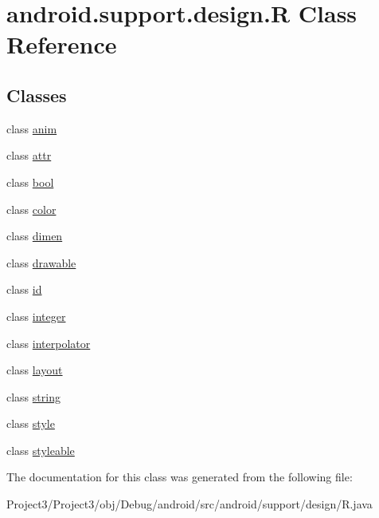 \hypertarget{classandroid_1_1support_1_1design_1_1R}{}\section{android.\+support.\+design.\+R Class Reference}
\label{classandroid_1_1support_1_1design_1_1R}
\subsection*{Classes}
\begin{DoxyCompactItemize}
\item 
class \hyperlink{classandroid_1_1support_1_1design_1_1R_1_1anim}{anim}
\item 
class \hyperlink{classandroid_1_1support_1_1design_1_1R_1_1attr}{attr}
\item 
class \hyperlink{classandroid_1_1support_1_1design_1_1R_1_1bool}{bool}
\item 
class \hyperlink{classandroid_1_1support_1_1design_1_1R_1_1color}{color}
\item 
class \hyperlink{classandroid_1_1support_1_1design_1_1R_1_1dimen}{dimen}
\item 
class \hyperlink{classandroid_1_1support_1_1design_1_1R_1_1drawable}{drawable}
\item 
class \hyperlink{classandroid_1_1support_1_1design_1_1R_1_1id}{id}
\item 
class \hyperlink{classandroid_1_1support_1_1design_1_1R_1_1integer}{integer}
\item 
class \hyperlink{classandroid_1_1support_1_1design_1_1R_1_1interpolator}{interpolator}
\item 
class \hyperlink{classandroid_1_1support_1_1design_1_1R_1_1layout}{layout}
\item 
class \hyperlink{classandroid_1_1support_1_1design_1_1R_1_1string}{string}
\item 
class \hyperlink{classandroid_1_1support_1_1design_1_1R_1_1style}{style}
\item 
class \hyperlink{classandroid_1_1support_1_1design_1_1R_1_1styleable}{styleable}
\end{DoxyCompactItemize}


The documentation for this class was generated from the following file\+:\begin{DoxyCompactItemize}
\item 
Project3/\+Project3/obj/\+Debug/android/src/android/support/design/R.\+java\end{DoxyCompactItemize}
